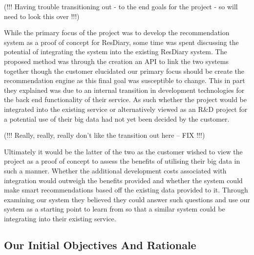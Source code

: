\documentclass{l3proj}
\begin{document}
(!!! Having trouble transitioning out - to the end goals for the project - so will need to look this over !!!) 

While the primary focus of the project was to develop the recommendation system as a proof of concept for ResDiary, some time was spent discussing the potential of integrating the system into the existing ResDiary system. The proposed method was through the creation an API to link the two systems together though the customer elucidated our primary focus should be create the recommendation engine as this final goal was susceptible to change. This in part they explained was due to an internal transition in development technologies for the back end functionality of their service. As such whether the project would be integrated into the existing service or alternatively viewed as an R\&D project for a potential use of their big data had not yet been decided by the customer. 

(!!! Really, really, really don’t like the transition out here -- FIX !!!)

Ultimately it would be the latter of the two as the customer wished to view the project as a proof of concept to assess the benefits of utilising their big data in such a manner. Whether the additional development costs associated with integration would outweigh the benefits provided and whether the system could make smart recommendations based off the existing data provided to it. Through examining our system they believed they could answer such questions and use our system as a starting point to learn from so that a similar system could be integrating into their existing service.


\subsection{Our Initial Objectives And Rationale}
\label{ourinitobjectives}


\end{document}
